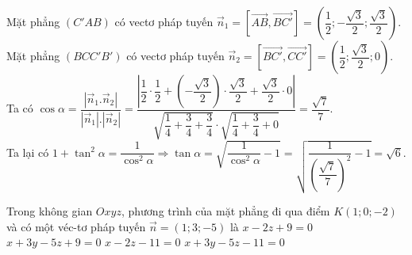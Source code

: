 \begin{ex}
{		 Mặt phẳng $\left( C'AB\right) $ có vectơ pháp tuyến $\overrightarrow{n}_1 = \left[\overrightarrow{AB}, \overrightarrow{BC'}\right] = \left(\dfrac{1}{2};-\dfrac{\sqrt{3}}{2};\dfrac{\sqrt{3}}{2}\right)$.\\
		Mặt phẳng $\left( BCC'B'\right) $ có vectơ pháp tuyến $\overrightarrow{n}_2 = \left[\overrightarrow{BC'}, \overrightarrow{CC'}\right]  = \left(\dfrac{1}{2};\dfrac{\sqrt{3}}{2};0\right)$.\\
		Ta có $\cos\alpha = \dfrac{\left|\overrightarrow{n}_1.\overrightarrow{n}_2\right|}{\left|\overrightarrow{n}_1\right|.\left|\overrightarrow{n}_2\right|} = \dfrac{\left|\dfrac{1}{2}\cdot\dfrac{1}{2} + \left(-\dfrac{\sqrt{3}}{2}\right)\cdot\dfrac{\sqrt{3}}{2} +  \dfrac{\sqrt{3}}{2}\cdot0\right|}{\sqrt{\dfrac{1}{4}+\dfrac{3}{4}+\dfrac{3}{4}}\cdot\sqrt{\dfrac{1}{4}+\dfrac{3}{4}+0}} = \dfrac{\sqrt{7}}{7}$.\\
		Ta lại có $1+\tan^2\alpha = \dfrac{1}{\cos^2\alpha} \Rightarrow \tan\alpha =  \sqrt{\dfrac{1}{\cos^2\alpha}-1} = \sqrt{\dfrac{1}{\left(\dfrac{\sqrt{7}}{7} \right)^2 }-1}=\sqrt{6}$.
	 }
\end{ex}

\begin{ex}%
	Trong không gian $Oxyz$, phương trình của mặt phẳng đi qua điểm $K(1;0;-2)$ và có một véc-tơ pháp tuyến $\overrightarrow{n}=(1;3;-5)$  là
	\choice 
		{$x-2z+9=0$} 
		{$x+3y-5z+9=0$} 
		 {$x-2z-11=0$}
		{\True $x+3y-5z-11=0$} 
\end{ex}

